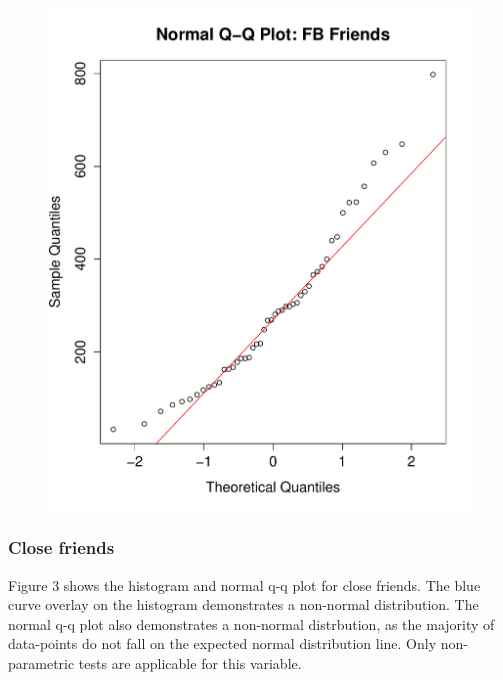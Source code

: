 \begin{figure}[H]
\includegraphics[scale=0.35]{./img/qqplot_fbfriends.pdf}
\end{figure}

\subsubsection{Close friends}

Figure 3 shows the histogram and normal q-q plot for close friends. The blue curve overlay on the histogram demonstrates a non-normal distribution. The normal q-q plot also demonstrates a non-normal distrbution, as the majority of data-points do not fall on the expected normal distribution line. Only non-parametric tests are applicable for this variable.

